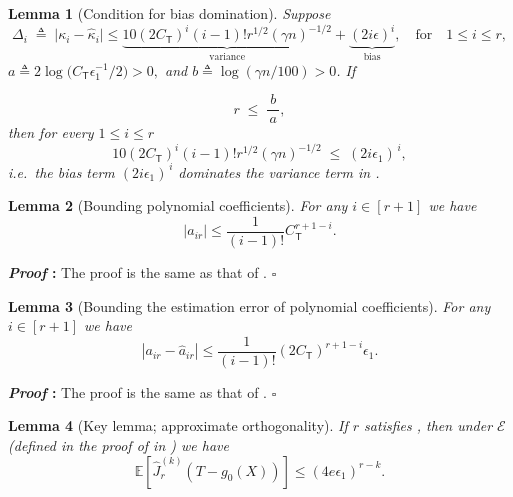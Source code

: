 \documentclass{article}
\def\eps{{\epsilon}}
\def\gE{{\mathcal{E}}}
\newcommand{\E}{\mathbb{E}}
\newcommand{\qtext}[1]{\quad\text{#1}\quad}
\def\defeq{\triangleq} %
\newtheorem{lemma}{Lemma}[section]
\renewenvironment{proof}{\noindent\textbf{\textit{Proof }:}}{\hfill$\square$}
\begin{document}
\begin{lemma}[Condition for bias domination] 
Suppose
\[
\Delta_i \; \defeq  \; \big|\kappa_i-\hat{\kappa}_i\big| \leq \underbrace{10(2C_{\mathsf{T}})^i(i-1)! r^{1/2}(\gamma n)^{-1/2}}_{\text{variance}} + \underbrace{(2i\eps)^i}_{\text{bias}},
\qtext{for} 1\le i\le r,
\label{eq:B1}
\]
$a\defeq  2\log\big(C_{\mathsf{T}}\eps_1^{-1}/2\big) > 0,$ 
and $
b\defeq \log(\gamma n/100)>0$.
If  

\begin{equation}\label{eq:bias-cond-general}
      r\;\le\;
      \frac{b}{\,a\,},
\end{equation}
then for every $1\le i\le r$
\[
10(2C_{\mathsf{T}})^i(i-1)! r^{1/2}(\gamma n)^{-1/2} \;\le\;(2i\eps_1)^{\,i},
\]
i.e.~the bias term $(2i\eps_1)^{\,i}$ dominates the variance term in
.
\end{lemma}

\begin{lemma}[Bounding polynomial coefficients]
    \label{lemma:a-ik-bound-general}
    For any $i\in[r+1]$ we have
    \begin{equation}
    \label{eq:a-ik-bound-general}
        |a_{ir}| \leq \frac{1}{(i-1)!} C_{\mathsf{T}}^{r+1-i}.
    \end{equation}
\end{lemma}

\begin{proof}
    The proof is the same as that of .
\end{proof}

\begin{lemma}[Bounding the estimation error of polynomial coefficients]
    \label{lemma:hat-a-ik-error-general}
    For any $i\in[r+1]$ we have
    \begin{equation}
        \label{eq:hat-a-ik-error-general}
        |a_{ir}-\hat{a}_{ir}| \leq \frac{1}{(i-1)!} (2C_{\mathsf{T}})^{r+1-i}  \eps_1.
    \end{equation}
\end{lemma}

\begin{proof}
    The proof is the same as that of .
\end{proof}

\begin{lemma}[Key lemma; approximate orthogonality]
    \label{lemma:derivative-expectation-general}
    If $r$ satisfies , then under $\gE$ (defined in the proof of  in ) we have 
    $$\E\left[\hat{J}_r^{(k)}(T-g_0(X))\right] \leq  (4e\eps_1)^{r-k}.$$
\end{lemma}
\end{document}
